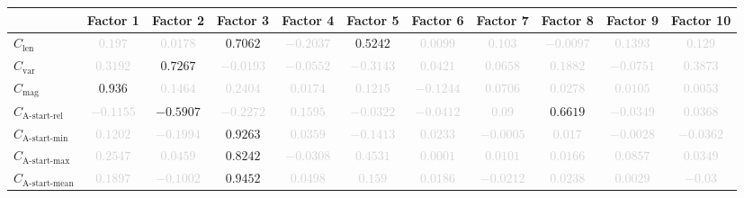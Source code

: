 \documentclass{standalone}
\newcommand{\magnitudename}{\text{mag}}
\newcommand{\magnitude}{C_{\magnitudename}}
\newcommand{\varietyname}{\text{var}}
\newcommand{\variety}{C_{\varietyname}}
\newcommand{\lengthname}{\text{len}}
\newcommand{\length}{C_{\lengthname}}
\newcommand{\startactivitiesrelname}{\text{A-start-rel}}
\newcommand{\startactivitiesrel}{C_{\startactivitiesrelname}}
\newcommand{\startminname}{\text{A-start-min}}
\newcommand{\startmin}{C_{\startminname}}
\newcommand{\startmaxname}{\text{A-start-max}}
\newcommand{\startmax}{C_{\startmaxname}}
\newcommand{\startmeanname}{\text{A-start-mean}}
\newcommand{\startmean}{C_{\startmeanname}}
\begin{document}
\begin{tabular}{lcccccccccc} \toprule 
 & \textbf{Factor 1} & \textbf{Factor 2} & \textbf{Factor 3} & \textbf{Factor 4} & \textbf{Factor 5} & \textbf{Factor 6} & \textbf{Factor 7} & \textbf{Factor 8} & \textbf{Factor 9} & \textbf{Factor 10} \\ \midrule 
$\length$ & \textcolor{lightgray}{$0.197$} & \textcolor{lightgray}{$0.0178$} & $0.7062$ & \textcolor{lightgray}{$-0.2037$} & $0.5242$ & \textcolor{lightgray}{$0.0099$} & \textcolor{lightgray}{$0.103$} & \textcolor{lightgray}{$-0.0097$} & \textcolor{lightgray}{$0.1393$} & \textcolor{lightgray}{$0.129$} \\ 
$\variety$ & \textcolor{lightgray}{$0.3192$} & $0.7267$ & \textcolor{lightgray}{$-0.0193$} & \textcolor{lightgray}{$-0.0552$} & \textcolor{lightgray}{$-0.3143$} & \textcolor{lightgray}{$0.0421$} & \textcolor{lightgray}{$0.0658$} & \textcolor{lightgray}{$0.1882$} & \textcolor{lightgray}{$-0.0751$} & \textcolor{lightgray}{$0.3873$} \\ 
$\magnitude$ & $0.936$ & \textcolor{lightgray}{$0.1464$} & \textcolor{lightgray}{$0.2404$} & \textcolor{lightgray}{$0.0174$} & \textcolor{lightgray}{$0.1215$} & \textcolor{lightgray}{$-0.1244$} & \textcolor{lightgray}{$0.0706$} & \textcolor{lightgray}{$0.0278$} & \textcolor{lightgray}{$0.0105$} & \textcolor{lightgray}{$0.0053$} \\ 
$\startactivitiesrel$ & \textcolor{lightgray}{$-0.1155$} & $-0.5907$ & \textcolor{lightgray}{$-0.2272$} & \textcolor{lightgray}{$0.1595$} & \textcolor{lightgray}{$-0.0322$} & \textcolor{lightgray}{$-0.0412$} & \textcolor{lightgray}{$0.09$} & $0.6619$ & \textcolor{lightgray}{$-0.0349$} & \textcolor{lightgray}{$0.0368$} \\ 
$\startmin$ & \textcolor{lightgray}{$0.1202$} & \textcolor{lightgray}{$-0.1994$} & $0.9263$ & \textcolor{lightgray}{$0.0359$} & \textcolor{lightgray}{$-0.1413$} & \textcolor{lightgray}{$0.0233$} & \textcolor{lightgray}{$-0.0005$} & \textcolor{lightgray}{$0.017$} & \textcolor{lightgray}{$-0.0028$} & \textcolor{lightgray}{$-0.0362$} \\ 
$\startmax$ & \textcolor{lightgray}{$0.2547$} & \textcolor{lightgray}{$0.0459$} & $0.8242$ & \textcolor{lightgray}{$-0.0308$} & \textcolor{lightgray}{$0.4531$} & \textcolor{lightgray}{$0.0001$} & \textcolor{lightgray}{$0.0101$} & \textcolor{lightgray}{$0.0166$} & \textcolor{lightgray}{$0.0857$} & \textcolor{lightgray}{$0.0349$} \\ 
$\startmean$ & \textcolor{lightgray}{$0.1897$} & \textcolor{lightgray}{$-0.1002$} & $0.9452$ & \textcolor{lightgray}{$0.0498$} & \textcolor{lightgray}{$0.159$} & \textcolor{lightgray}{$0.0186$} & \textcolor{lightgray}{$-0.0212$} & \textcolor{lightgray}{$0.0238$} & \textcolor{lightgray}{$0.0029$} & \textcolor{lightgray}{$-0.03$} \\ 

\end{tabular}
\end{document}
